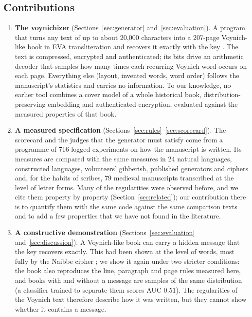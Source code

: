 \subsection{Contributions}

\begin{enumerate}
\item \textbf{The voynichizer} (Sections~\ref{sec:generator} and~\ref{sec:evaluation}). A program that turns any text
  of up to about 20{,}000 characters into a 207-page Voynich-like book in EVA transliteration and recovers it exactly with the key
  \citep{voynichizer}. The text is compressed, encrypted and authenticated; its bits drive an arithmetic decoder that
  samples how many times each recurring Voynich word occurs on each page. Everything else (layout, invented words, word
  order) follows the manuscript's statistics and carries no information. To our knowledge, no earlier tool combines a
  cover model of a whole historical book, distribution-preserving embedding and authenticated encryption, evaluated
  against the measured properties of that book.
\item \textbf{A measured specification} (Sections~\ref{sec:rules}--\ref{sec:scorecard}). The scorecard and the judges
  that the generator must satisfy come from a programme of 716 logged experiments on how the manuscript is written.
  Its measures are compared with the same measures in 24 natural languages, constructed languages, volunteers'
  gibberish, published generators and ciphers and, for the habits of scribes, 79 medieval manuscripts transcribed at
  the level of letter forms. Many of
  the regularities were observed before, and we cite them property by property (Section~\ref{sec:related}); our
  contribution there is to quantify them with the same code against the same comparison texts and to add a few
  properties that we have not found in the literature.
\item \textbf{A constructive demonstration} (Sections~\ref{sec:evaluation} and~\ref{sec:discussion}). A Voynich-like
  book can carry a hidden message that the key recovers exactly. This had been shown at the level of words, most fully
  by the Naibbe cipher \citep{greshko2025}; we show it again under two stricter conditions: the book also reproduces
  the line, paragraph and page rules measured here, and books with and without a message are samples of the same
  distribution (a classifier trained to separate them scores AUC 0.51). The regularities of the Voynich text therefore
  describe how it was written, but they cannot show whether it contains a message.
\end{enumerate}

